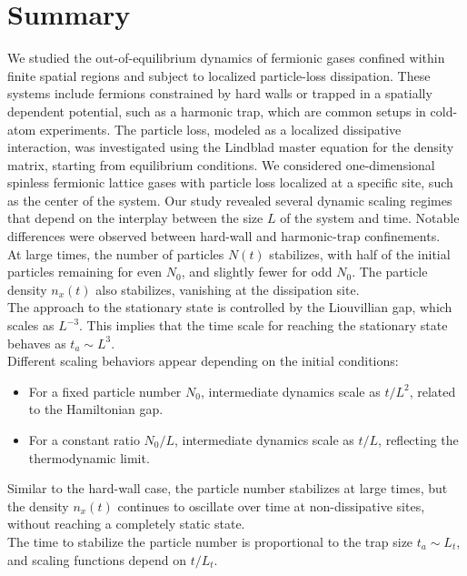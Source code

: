 \section{Summary}

    We studied the out-of-equilibrium dynamics of fermionic gases confined within finite spatial regions and subject to localized particle-loss dissipation. These systems include fermions constrained by hard walls or trapped in a spatially dependent potential, such as a harmonic trap, which are common setups in cold-atom experiments. The particle loss, modeled as a localized dissipative interaction, was investigated using the Lindblad master equation for the density matrix, starting from equilibrium conditions.
    We considered one-dimensional spinless fermionic lattice gases with particle loss localized at a specific site, such as the center of the system. Our study revealed several dynamic scaling regimes that depend on the interplay between the size \( L \) of the system and time. Notable differences were observed between hard-wall and harmonic-trap confinements.\\
    At large times, the number of particles \( N(t) \) stabilizes, with half of the initial particles remaining for even \( N_0 \), and slightly fewer for odd \( N_0 \). The particle density \( n_x(t) \) also stabilizes, vanishing at the dissipation site.\\
    The approach to the stationary state is controlled by the Liouvillian gap, which scales as \( L^{-3} \). This implies that the time scale for reaching the stationary state behaves as \( t_a \sim L^3 \).\\
    Different scaling behaviors appear depending on the initial conditions:
    \begin{itemize}
        \item For a fixed particle number \( N_0 \), intermediate dynamics scale as \( t/L^2 \), related to the Hamiltonian gap.
        \item For a constant ratio \( N_0/L \), intermediate dynamics scale as \( t/L \), reflecting the thermodynamic limit. 
    \end{itemize}
    Similar to the hard-wall case, the particle number stabilizes at large times, but the density \( n_x(t) \) continues to oscillate over time at non-dissipative sites, without reaching a completely static state.\\
    The time to stabilize the particle number is proportional to the trap size \( t_a \sim L_t \), and scaling functions depend on \( t/L_t \).\\

